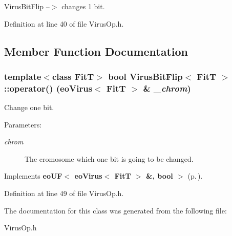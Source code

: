 Virus\-Bit\-Flip --$>$ changes 1 bit. 



Definition at line 40 of file Virus\-Op.h.

\subsection{Member Function Documentation}
\subsubsection{\setlength{\rightskip}{0pt plus 5cm}template$<$class Fit\-T$>$ bool {\bf Virus\-Bit\-Flip}$<$ {\bf Fit\-T} $>$::operator() (eo\-Virus$<$ {\bf Fit\-T} $>$ \& {\em \_\-chrom})\hspace{0.3cm}{\tt  [inline, virtual]}}\label{class_virus_bit_flip_a1}


Change one bit. 

\begin{Desc}
\item[Parameters:]
\begin{description}
\item[{\em chrom}]The cromosome which one bit is going to be changed. \end{description}
\end{Desc}


Implements {\bf eo\-UF$<$ eo\-Virus$<$ Fit\-T $>$ \&, bool $>$} {\rm (p.\,\pageref{classeo_u_f_a1})}.

Definition at line 49 of file Virus\-Op.h.

The documentation for this class was generated from the following file:\begin{CompactItemize}
\item 
Virus\-Op.h\end{CompactItemize}
